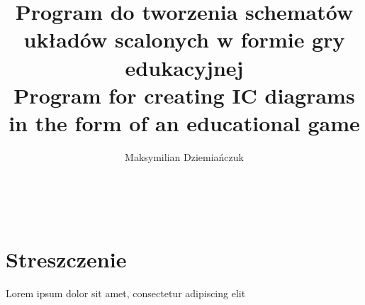 \documentclass[12pt,a4paper,twoside]{report}
\title{\textbf{Program do tworzenia schematów układów scalonych w formie gry edukacyjnej}\\[2ex]
    \large Program for creating IC diagrams in the form of an educational game\\
}
\author{Maksymilian Dziemiańczuk}
\date{}
\begin{document}


\newpage \thispagestyle{empty} \ \newpage

\section*{Streszczenie}
\thispagestyle{plain}

Lorem ipsum dolor sit amet, consectetur adipiscing elit

\tableofcontents






\end{document}
